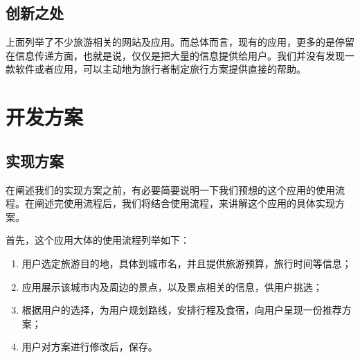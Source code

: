 \documentclass[12pt,a4paper]{article}
\begin{document}
\begin{CJK}{UTF8}{gbsn}
	\subsection{创新之处}
	上面列举了不少旅游相关的网站及应用。而总体而言，现有的应用，更多的是停留在信息传递方面，也就是说，仅仅是把大量的信息提供给用户。我们并没有发现一款软件或者应用，可以主动地为旅行者制定旅行方案提供直接的帮助。


\clearpage
\section{开发方案}

	\subsection{实现方案}
	在阐述我们的实现方案之前，有必要简要说明一下我们预想的这个应用的使用流程。在阐述完使用流程后，我们将结合使用流程，来讲解这个应用的具体实现方案。

	首先，这个应用大体的使用流程列举如下：
	\begin{enumerate}
		\item
		用户选定旅游目的地，具体到城市名，并且提供旅游预算，旅行时间等信息；
		\item
		应用展示该城市内及周边的景点，以及景点相关的信息，供用户挑选；
		\item
		根据用户的选择，为用户规划路线，安排行程及食宿，向用户呈现一份推荐方案；
		\item
		用户对方案进行修改后，保存。
	\end{enumerate}
	

\end{CJK}
\end{document}
